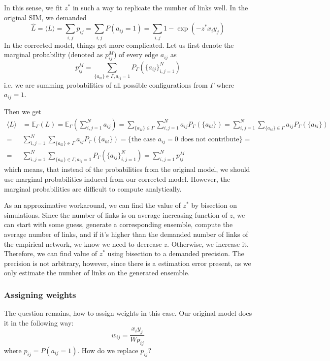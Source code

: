 In this sense, we fit $z^*$ in such a way to replicate the number of links well. In the original SIM, we demanded
\begin{equation}
    \hat{L} = \langle L \rangle = \sum_{i,j} p_{ij} = \sum_{i,j} P(a_{ij} = 1) = \sum_{i,j} 1-\exp{(-z^*x_iy_j)}
\end{equation}
In the corrected model, things get more complicated. 
Let us first denote the marginal probability (denoted as $p_{ij}^M$) of every edge $a_{ij}$ as
\begin{equation}
    p_{ij}^M = \sum_{\{a_{kl}\} \in \Gamma, a_{ij} = 1} P_\Gamma\left(\{a_{ij}\}_{i,j=1}^N\right)
\end{equation}
i.e. we are summing probabilities of all possible configurations from $\Gamma$ where $a_{ij} = 1$. 

Then we get
\begin{align}
    \langle L \rangle &= \mathbb{E}_\Gamma\left(L\right) = \mathbb{E}_\Gamma\left(\sum_{i,j=1}^{N} a_{ij}\right) = \sum_{\{a_{kl}\} \in \Gamma} \sum_{i,j=1}^{N} a_{ij} P_\Gamma\left(\{a_{kl}\}\right) = \sum_{i,j=1}^{N} \sum_{\{a_{kl}\} \in \Gamma} a_{ij} P_\Gamma\left(\{a_{kl}\}\right)\\
    =&  \sum_{i,j=1}^{N} \sum_{\{a_{kl}\} \in \Gamma} a_{ij} P_\Gamma\left(\{a_{kl}\}\right) = \text{\{the case $a_{ij} = 0$ does not contribute\}} = \\
    =& \sum_{i,j=1}^{N} \sum_{\{a_{kl}\} \in \Gamma, a_{ij} = 1} P_\Gamma\left(\{a_{ij}\}_{i,j=1}^N\right) = \sum_{i,j=1}^{N} p_{ij}^M
\end{align}
which means, that instead of the probabilities from the original model, we should use marginal probabilities induced from our corrected model. However, the marginal probabilities are difficult to compute analytically. 

As an approximative workaround, we can find the value of $z^*$ by bisection on simulations. Since the number of links is on average increasing function of $z$, we can start with some guess, generate a corresponding ensemble, compute the average number of links, and if it's higher than the demanded number of links of the empirical network, we know we need to decrease $z$. Otherwise, we increase it. Therefore, we can find value of $z^*$ using bisection to a demanded precision. The precision is not arbitrary, however, since there is a estimation error present, as we only estimate the number of links on the generated ensemble.

\subsubsection{Assigning weights}
The question remains, how to assign weights in this case. Our original model does it in the following way:
\begin{equation}
    w_{ij} = \frac{x_iy_j}{Wp_{ij}}
\end{equation}
where $p_{ij} = P(a_{ij} = 1)$. How do we replace $p_{ij}$?

